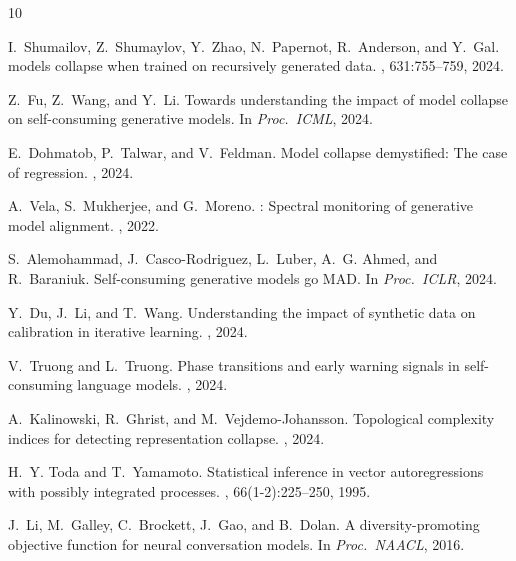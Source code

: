 \documentclass[letterpaper,11pt]{article}
\begin{document}

\begin{thebibliography}{10}

I.~Shumailov, Z.~Shumaylov, Y.~Zhao, N.~Papernot, R.~Anderson, and Y.~Gal.
 models collapse when trained on recursively generated data.
, 631:755--759, 2024.

Z.~Fu, Z.~Wang, and Y.~Li.
\newblock Towards understanding the impact of model collapse on self-consuming generative models.
\newblock In {\em Proc.\ ICML}, 2024.

E.~Dohmatob, P.~Talwar, and V.~Feldman.
\newblock Model collapse demystified: The case of regression.
, 2024.

A.~Vela, S.~Mukherjee, and G.~Moreno.
: Spectral monitoring of generative model alignment.
, 2022.

S.~Alemohammad, J.~Casco-Rodriguez, L.~Luber, A.~G. Ahmed, and R.~Baraniuk.
\newblock Self-consuming generative models go {MAD}.
\newblock In {\em Proc.\ ICLR}, 2024.

Y.~Du, J.~Li, and T.~Wang.
\newblock Understanding the impact of synthetic data on calibration in iterative learning.
, 2024.

V.~Truong and L.~Truong.
\newblock Phase transitions and early warning signals in self-consuming language models.
, 2024.

A.~Kalinowski, R.~Ghrist, and M.~Vejdemo-Johansson.
\newblock Topological complexity indices for detecting representation collapse.
, 2024.

H.~Y. Toda and T.~Yamamoto.
\newblock Statistical inference in vector autoregressions with possibly integrated processes.
, 66(1-2):225--250, 1995.

J.~Li, M.~Galley, C.~Brockett, J.~Gao, and B.~Dolan.
\newblock A diversity-promoting objective function for neural conversation models.
\newblock In {\em Proc.\ NAACL}, 2016.

\end{thebibliography}

\appendix
\end{document}

